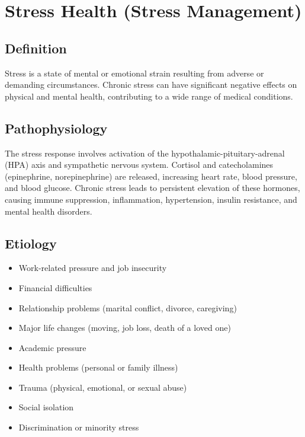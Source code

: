 \chapter{Stress Health (Stress Management)}

\section{Definition}
Stress is a state of mental or emotional strain resulting from adverse or demanding circumstances. Chronic stress can have significant negative effects on physical and mental health, contributing to a wide range of medical conditions.

\section{Pathophysiology}
The stress response involves activation of the hypothalamic-pituitary-adrenal (HPA) axis and sympathetic nervous system. Cortisol and catecholamines (epinephrine, norepinephrine) are released, increasing heart rate, blood pressure, and blood glucose. Chronic stress leads to persistent elevation of these hormones, causing immune suppression, inflammation, hypertension, insulin resistance, and mental health disorders.

\section{Etiology}
\begin{itemize}
\item Work-related pressure and job insecurity
\item Financial difficulties
\item Relationship problems (marital conflict, divorce, caregiving)
\item Major life changes (moving, job loss, death of a loved one)
\item Academic pressure
\item Health problems (personal or family illness)
\item Trauma (physical, emotional, or sexual abuse)
\item Social isolation
\item Discrimination or minority stress
\end{itemize}

